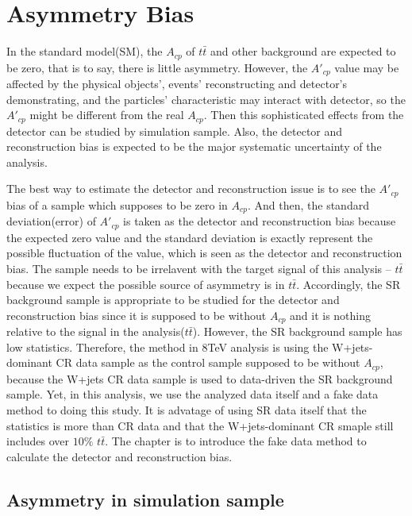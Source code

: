 

\section{Asymmetry Bias}
\label{sec:AsymBias}

	In the standard model(SM), the $A_{cp}$ of $t\bar{t}$ and other background are expected to be zero, that is to say, there is little asymmetry. However, the $A'_{cp}$ value may be affected by the physical objects', events' reconstructing and detector's demonstrating, and the particles' characteristic may interact with detector, so the $A'_{cp}$ might be different from the real $A_{cp}$. Then this sophisticated effects from the detector can be studied by simulation sample. Also, the detector and reconstruction bias is expected to be the major systematic uncertainty of the analysis.

	The best way to estimate the detector and reconstruction issue is to see the $A'_{cp}$ bias of a sample which supposes to be zero in $A_{cp}$. And then, the standard deviation(error) of $A'_{cp}$ is taken as the detector and reconstruction bias because the expected zero value and the standard deviation is exactly represent the possible fluctuation of the value, which is seen as the detector and reconstruction bias. The sample needs to be irrelavent with the target signal of this analysis -- $t\bar{t}$ because we expect the possible source of asymmetry is in $t\bar{t}$. Accordingly, the SR background sample is appropriate to be studied for the detector and reconstruction bias since it is supposed to be without $A_{cp}$ and it is nothing relative to the signal in the analysis($t\bar{t}$). However, the SR background sample has low statistics. Therefore, the method in 8TeV analysis is using the W+jets-dominant CR data sample as the control sample supposed to be without $A_{cp}$, because the W+jets CR data sample is used to data-driven the SR background sample. Yet, in this analysis, we use the analyzed data itself and a fake data method to doing this study. It is advatage of using SR data itself that the statistics is more than CR data and that the W+jets-dominant CR smaple still includes over $10\%$ $t\bar{t}$. The chapter is to introduce the fake data method to calculate the detector and reconstruction bias.

	\subsection{Asymmetry in simulation sample}
	\label{ssec:Asym_in_sim}

